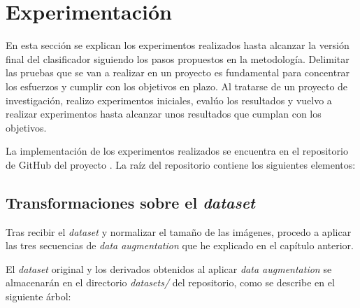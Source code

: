 \chapter{Experimentación}
En esta sección se explican los experimentos realizados hasta alcanzar la versión final del clasificador siguiendo los pasos propuestos en la metodología. Delimitar las pruebas que se van a realizar en un proyecto es fundamental para concentrar los esfuerzos y cumplir con los objetivos en plazo. Al tratarse de un proyecto de investigación, realizo experimentos iniciales, evalúo los resultados y vuelvo a realizar experimentos hasta alcanzar unos resultados que cumplan con los objetivos.

La implementación de los experimentos realizados se encuentra en el repositorio de GitHub del proyecto \cite{repository}. La raíz del repositorio contiene los siguientes elementos:


\newpage
\section{Transformaciones sobre el \textit{dataset}}
Tras recibir el \textit{dataset} y normalizar el tamaño de las imágenes, procedo a aplicar las tres secuencias de \textit{data augmentation} que he explicado en el capítulo anterior.

El \textit{dataset} original y los derivados obtenidos al aplicar \textit{data augmentation} se almacenarán en el directorio \textit{datasets/} del repositorio, como se describe en el siguiente árbol:

\vspace{0.2cm}

